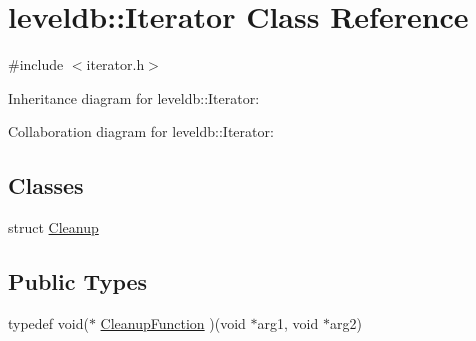 \hypertarget{classleveldb_1_1_iterator}{\section{leveldb\-:\-:Iterator Class Reference}
\label{classleveldb_1_1_iterator}
}


{\ttfamily \#include $<$iterator.\-h$>$}



Inheritance diagram for leveldb\-:\-:Iterator\-:


Collaboration diagram for leveldb\-:\-:Iterator\-:
\subsection*{Classes}
\begin{DoxyCompactItemize}
\item 
struct \hyperlink{structleveldb_1_1_iterator_1_1_cleanup}{Cleanup}
\end{DoxyCompactItemize}
\subsection*{Public Types}
\begin{DoxyCompactItemize}
\item 
typedef void($\ast$ \hyperlink{classleveldb_1_1_iterator_a3bb875a5d70208c14bcbd785c24e334f}{Cleanup\-Function} )(void $\ast$arg1, void $\ast$arg2)
\end{DoxyCompactItemize}
